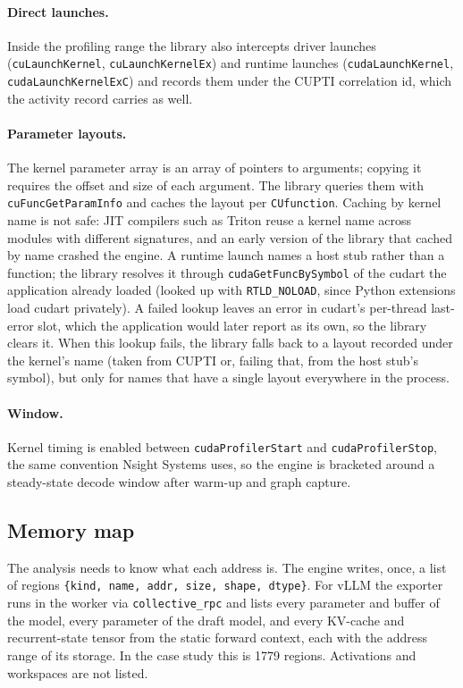 \paragraph{Direct launches.}
Inside the profiling range the library also intercepts driver launches
(\texttt{cuLaunchKernel}, \texttt{cuLaunchKernelEx}) and runtime launches
(\texttt{cudaLaunchKernel}, \texttt{cudaLaunchKernelExC}) and records them under the CUPTI
correlation id, which the activity record carries as well.

\paragraph{Parameter layouts.}
The kernel parameter array is an array of pointers to arguments; copying it requires the offset
and size of each argument. The library queries them with \texttt{cuFuncGetParamInfo} and caches
the layout per \texttt{CUfunction}. Caching by kernel name is not safe: JIT compilers such as
Triton reuse a kernel name across modules with different signatures, and an early version of the
library that cached by name crashed the engine. A runtime launch names a host stub rather than a
function; the library resolves it through \texttt{cudaGetFuncBySymbol} of the cudart the
application already loaded (looked up with \texttt{RTLD\_NOLOAD}, since Python extensions load
cudart privately). A failed lookup leaves an error in cudart's per-thread last-error slot, which
the application would later report as its own, so the library clears it. When this lookup fails, the library
falls back to a layout recorded under the kernel's name (taken from CUPTI or, failing that, from
the host stub's symbol), but only for names that have a single layout everywhere in the process.

\paragraph{Window.}
Kernel timing is enabled between \texttt{cudaProfilerStart} and \texttt{cudaProfilerStop}, the
same convention Nsight Systems uses, so the engine is bracketed around a steady-state decode
window after warm-up and graph capture.

\subsection{Memory map}\label{sec:regions}

The analysis needs to know what each address is. The engine writes, once, a list of regions
\texttt{\{kind, name, addr, size, shape, dtype\}}. For vLLM the exporter runs in the worker via
\texttt{collective\_rpc} and lists every parameter and buffer of the model, every parameter of the draft model,
and every KV-cache and recurrent-state tensor from the static forward context, each with the
address range of its storage. In the case study this is 1779 regions. Activations and workspaces
are not listed.

